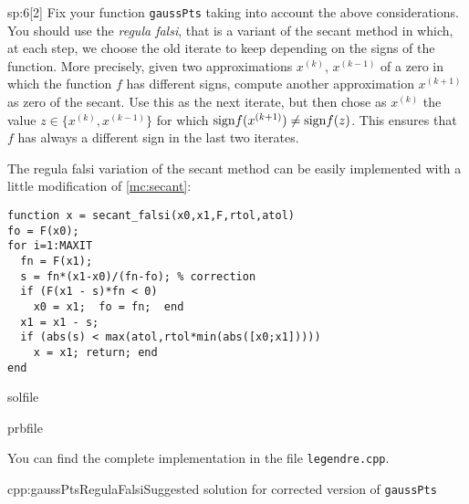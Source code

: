 \begin{samproblem}
\begin{subproblem}{sp:6}[2]
  Fix your function \texttt{gaussPts} taking into account the above considerations. You should use the \emph{regula falsi}, 
  that is a variant of the secant method in which, at each step, we choose the old iterate to keep depending on the signs of the function. 
  More precisely, given two approximations $x^{(k)}$, $x^{(k-1)}$ of a zero in which the function $f$ has different signs, 
  compute another approximation $x^{(k+1)}$ as zero of the secant. Use this as the next iterate, but then chose as $x^{(k)}$ the value 
  $z \in \{ x^{(k)} ,x^{(k-1)}\}$ for which $ {\rm sign} f(x^{(k+1)}) \neq {\rm sign} f(z)$. 
  This ensures that $f$ has always a different sign in the last two iterates.

  \begin{samhint}
    The regula falsi variation of the secant method can be easily implemented with a little modification of \cref{mc:secant}:
    \begin{lstlisting}[style=mcode]
function x = secant_falsi(x0,x1,F,rtol,atol)
fo = F(x0);
for i=1:MAXIT
  fn = F(x1);
  s = fn*(x1-x0)/(fn-fo); % correction
  if (F(x1 - s)*fn < 0)
    x0 = x1;  fo = fn;  end
  x1 = x1 - s;
  if (abs(s) < max(atol,rtol*min(abs([x0;x1]))))
    x = x1; return; end
end  
    \end{lstlisting}
  \end{samhint}
  \begin{samwriteprbpart}{solfile}
    \begin{writeverbatim}{prbfile}
      \begin{samsolution}
        You can find the complete implementation in the file \texttt{legendre.cpp}.
        \begin{samcode}[C++-code]{cpp:gaussPtsRegulaFalsi}{Suggested solution for corrected version of \texttt{gaussPts}}
        \end{samcode}
      \end{samsolution}
    \end{writeverbatim}
  \end{samwriteprbpart}
\end{subproblem}

\end{samproblem}
